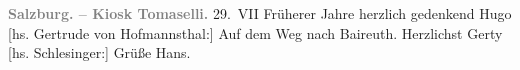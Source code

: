 \begin{ledgroupsized}[t]{13cm}
           \noindent{}\centering{}\textcolor{gray}{\textbf{{\pb}Salzburg. – Kiosk Tomaselli.}}\pend
           \pstart
           \raggedleft{}29. VII\pend
           \pstart
           Früherer Jahre herzlich gedenkend\pend
           \pstart \spacefill\mbox{Hugo}\pend{}\pstart
           {[}hs. Gertrude von Hofmannsthal:{]} Auf dem Weg nach Baireuth. Herzlichst \spacefill\mbox{Gerty}\pend
           \pstart
           {[}hs. Schlesinger:{]} Grüße \spacefill\mbox{Hans.}\pend
           
         
         \endnumbering{}\end{ledgroupsized}  \newcommand{\dateiname}{L01618}\newcommand{\titel}{Hugo und Gerty von Hofmannsthal, Hans Schlesinger an Arthur Schnitzler, 29. 7. 1906}\newcommand{\editorInnen}{Martin Anton Müller und Gerd-Hermann Susen}
      